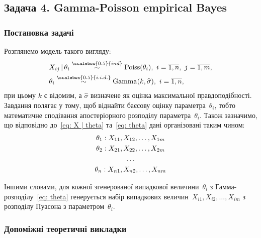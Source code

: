 \subsection*{Задача 4. Gamma-Poisson empirical Bayes}

\setcounter{subsection}{4}
\setcounter{equation}{0}

\subsubsection*{Постановка задачі}

Розглянемо модель такого вигляду:
\begin{align}
    & X_{ij} \,|\, \theta_i \overset{\scalebox{0.5}{ind}}{\sim} \mathrm{Poiss}(\theta_i),\ i=\overline{1,n},\ j=\overline{1,m}, \label{eq: X | theta} \\
    & \theta_i \overset{\scalebox{0.5}{i.i.d.}}{\sim} \mathrm{Gamma}(k,\widehat{\sigma}),\ i=\overline{1,n},  \label{eq: theta}
\end{align}
при цьому $k$ є відомим, а $\widehat{\sigma}$ визначене як оцінка максимальної правдоподібності. Завдання полягає у тому, щоб віднайти баєсову оцінку параметра~$\theta_i$, тобто математичне сподівання апостеріорного розподілу параметра~$\theta_i$. Також зазначимо, що відповідно до~\eqref{eq: X | theta} та~\eqref{eq: theta} дані організовані таким чином:
\begin{equation}
    \begin{gathered}
        \theta_1 : X_{11},X_{12},\ldots,X_{1m} \\
        \theta_2 : X_{21},X_{22},\ldots,X_{2m} \\
        \hfill \ldots \hfill  \\
        \theta_n : X_{n1},X_{n2},\ldots,X_{nm}
    \end{gathered} 
\end{equation}

Іншими словами, для кожної згенерованої випадкової величини~$\theta_i$ з Гамма-розподілу~\eqref{eq: theta} генерується набір випадкових величин~$X_{i1},X_{i2},\ldots,X_{im}$ з розподілу Пуасона з параметром~$\theta_i$.

\subsubsection*{Допоміжні теоретичні викладки}

